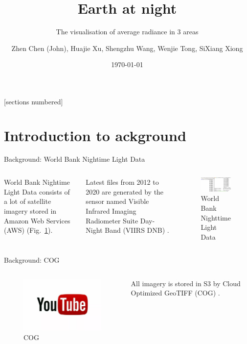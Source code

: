 \documentclass[aspectratio=169]{beamer}
\title{Earth at night}
\subtitle{The visualisation of average radiance in 3 areas}
\date{\today}
\author{Zhen Chen (John), Huajie Xu, Shengzhu Wang, Wenjie Tong, SiXiang Xiong}
\begin{document}
 
\maketitle

\begin{frame}{}
  [sections numbered]
  \tableofcontents[hideallsubsections]
\end{frame}

\section{Introduction to ackground}

\begin{frame}[fragile]{Background: World Bank Nightime Light Data}

  \begin{columns}
    World Bank Nightime Light Data consists of a lot of satellite imagery 
    stored in Amazon Web Services (AWS) (Fig.~\ref{wbs3}). 
    
    Latest files from 2012 to 2020 are generated by the sensor 
    named Visible Infrared Imaging Radiometer Suite Day-Night Band (VIIRS DNB) \citep{WorldBan13:online}.
    
      \begin{figure}[htbp]
        \centerline{\includegraphics[width=200pt]{images/3.1.png}}
        \caption{World Bank Nighttime Light Data}
        \label{wbs3}
      \end{figure}
    \end{columns}
  \end{frame}
  
\begin{frame}[fragile]{Background: COG}

  \begin{columns}
    
    \begin{figure}[htbp]
      \centerline{\includegraphics[width=200pt]{images/youtube.png}}
      \caption{COG}
      \label{youtube}
    \end{figure}

    All imagery is stored in S3 by Cloud Optimized GeoTIFF (COG) \citep{CloudOpt5:online}.
  \end{columns}
\end{frame}
\end{document}
